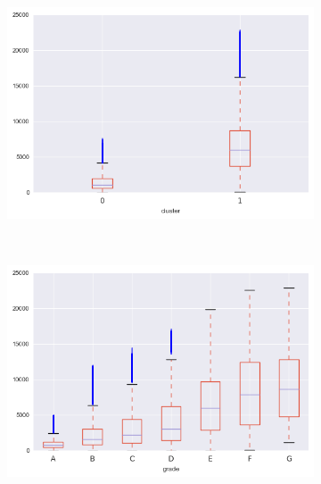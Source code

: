 \begin{apendicesenv}
\begin{figure}[t!]
\begin{subfigure}[t]{0.5\textwidth}
			\centerline{\includegraphics[width=1.05\textwidth]{img/total_rec_int_by_cluster}}
    	\end{subfigure}%
    	~ 
    	\begin{subfigure}[t]{0.5\textwidth}
    		\centering
   
			\centerline{\includegraphics[width=1.05\textwidth]{img/total_rec_int_by_grade}}

    	\end{subfigure}
\end{figure}



\begin{figure}[t!]
    \centering
        \caption{total\textunderscore pymnt\textunderscore inv }
    	\begin{subfigure}[t]{0.5\textwidth}
    		\centering


\end{subfigure}
\end{figure}
\end{apendicesenv}
